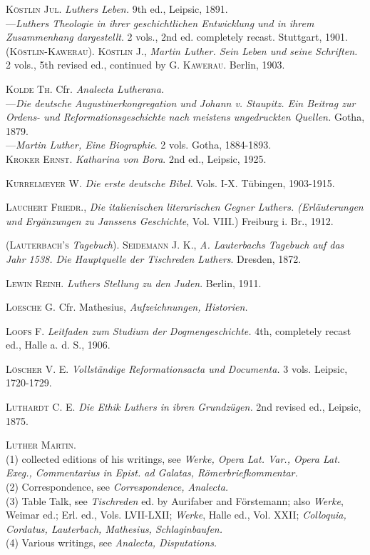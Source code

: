 \textsc{Köstlin Jul.} \textit{Luthers Leben.} 9th ed., Leipsic, 1891. \\
---\textit{Luthers Theologie in ihrer geschichtlichen Entwicklung und in ihrem
Zusammenhang dargestellt}. 2 vols., 2nd ed. completely recast. Stuttgart,
1901. \\

(\textsc{Köstlin-Kawerau}). \textsc{Köstlin J.}, \textit{Martin Luther. Sein Leben und seine
Schriften.} 2 vols., 5th revised ed., continued by \textsc{G. Kawerau}. Berlin,
1903.

\textsc{Kolde Th.} Cfr. \textit{Analecta Lutherana.} \\
---\textit{Die deutsche Augustinerkongregation und Johann v. Staupitz. Ein
Beitrag zur Ordens- und Reformationsgeschichte nach meistens ungedruckten
Quellen.} Gotha, 1879. \\
---\textit{Martin Luther, Eine Biographie}. 2 vols. Gotha, 1884-1893. \\

\textsc{Kroker Ernst.} \textit{Katharina von Bora}. 2nd ed., Leipsic, 1925.

\textsc{Kurrelmeyer W.} \textit{Die erste deutsche Bibel.} Vols. I-X. Tübingen, 1903-1915.

\textsc{Lauchert Friedr.}, \textit{Die italienischen literarischen Gegner Luthers. (Erläuterungen
und Ergänzungen zu Janssens Geschichte}, Vol. VIII.) Freiburg i.
Br., 1912.

(\textsc{Lauterbach’s} \textit{Tagebuch}). \textsc{Seidemann J. K.}, \textit{A. Lauterbachs Tagebuch
auf das Jahr 1538. Die Hauptquelle der Tischreden Luthers}. Dresden, 1872.

\textsc{Lewin Reinh.} \textit{Luthers Stellung zu den Juden}. Berlin, 1911.

\textsc{Loesche G.} Cfr. Mathesius, \textit{Aufzeichnungen, Historien.}

\textsc{Loofs F.} \textit{Leitfaden zum Studium der Dogmengeschichte.} 4th, completely
recast ed., Halle a. d. S., 1906.

\textsc{Löscher V. E.} \textit{Vollständige Reformationsacta und Documenta.} 3 vols.
Leipsic, 1720-1729.

\textsc{Luthardt C. E.} \textit{Die Ethik Luthers in ibren Grundzügen.} 2nd revised ed.,
Leipsic, 1875.

\textsc{Luther Martin.} \\
(1) collected editions of his writings, see \textit{Werke, Opera
Lat. Var., Opera Lat. Exeg., Commentarius in Epist. ad Galatas, Römerbriefkommentar.} \\
(2) Correspondence, see \textit{Correspondence, Analecta.} \\
(3) Table Talk, see \textit{Tischreden} ed. by Aurifaber and Förstemann; also
\textit{Werke}, Weimar ed.; Erl. ed., Vols. LVII-LXII; \textit{Werke}, Halle ed., Vol.
XXII; \textit{Colloquia, Cordatus, Lauterbach, Mathesius, Schlaginbaufen.} \\
(4) Various writings, see \textit{Analecta, Disputations.}

